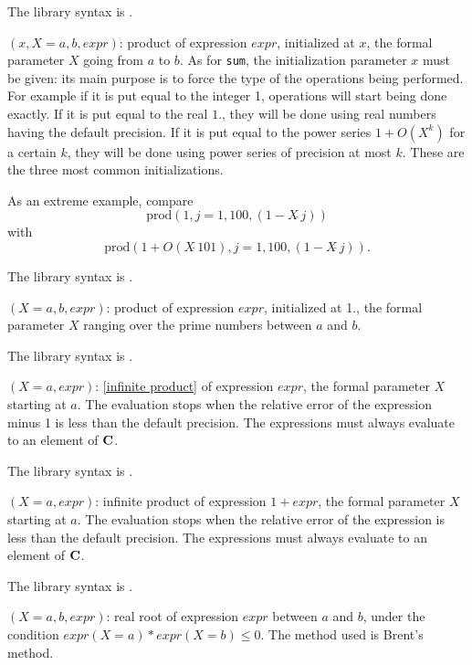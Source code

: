 The library syntax is .

$(x,X=a,b,expr)$: product of expression $expr$, initialized
at $x$, the formal parameter $X$ going from $a$ to $b$. As for {\tt sum}, the
initialization parameter $x$ must be given: its main purpose is to force
the type of the operations being performed. For example if it is put equal
to the integer 1, operations will start being done exactly. If it is put
equal to the real $1.$, they will be done using real numbers having the
default
precision. If it is put equal to the power series $1+O(X^k)$ for a certain
$k$, they will be done using power series of precision at most $k$. These
are the three most common initializations.

As an extreme example, compare $$\text{prod}(1,j=1,100,(1-X\hat{\ }j))$$
with  $$\text{prod}(1+O(X\hat{\ }101),j=1, 100, (1-X\hat{\ }j) ).$$

The library syntax is .

$(X=a,b,expr)$: product of expression $expr$,
initialized at 1., the formal parameter $X$ ranging over the prime numbers
between $a$ and $b$.

The library syntax is .

$(X=a,expr)$: \ref{infinite product} of expression $expr$, 
the formal parameter $X$ starting at $a$. The evaluation stops when the 
relative error of the expression minus 1 is less than the default precision. 
The expressions must always evaluate to an element of $\Bbb C$.

The library syntax is .

$(X=a,expr)$: infinite product of expression $1+expr$, the
formal parameter $X$ starting at $a$. The evaluation stops when the relative 
error of the expression is less than the default precision. The expressions
must always evaluate to an element of $\Bbb C$.

The library syntax is .

$(X=a,b,expr)$: real root of expression $expr$ between $a$ and
$b$, under the condition $expr(X=a)*expr(X=b)\le0$. The method used is 
Brent's method.

